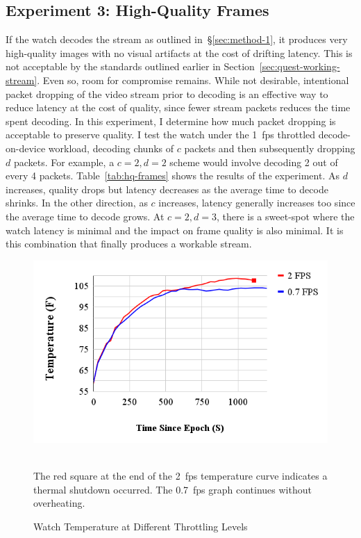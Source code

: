 \subsection{Experiment 3: High-Quality Frames}
If the watch decodes the stream as outlined in~\S\ref{sec:method-1}, it produces very high-quality images with no visual artifacts at the cost of drifting latency. This is not acceptable by the standards outlined earlier in Section~\ref{sec:quest-working-stream}. Even so, room for compromise remains. While not desirable, intentional packet dropping of the video stream prior to decoding is an effective way to reduce latency at the cost of quality, since fewer stream packets reduces the time spent decoding. In this experiment, I determine how much packet dropping is acceptable to preserve quality. I test the watch under the 1~fps throttled decode-on-device workload, decoding chunks of $c$ packets and then subsequently dropping $d$ packets. For example, a $c=2, d=2$ scheme would involve decoding 2 out of every 4 packets. Table~\ref{tab:hq-frames} shows the results of the experiment. As $d$ increases, quality drops but latency decreases as the average time to decode shrinks. In the other direction, as $c$ increases, latency generally increases too since the average time to decode grows. At $c=2, d=3$, there is a sweet-spot where the watch latency is minimal and the impact on frame quality is also minimal. It is this combination that finally produces a workable stream.

\begin{figure}
    \centering
    \includegraphics[width=0.8\linewidth]{chapter3/FIGS/temperature.png}
    \begin{captext}
    \\[0.1cm]
    \small The red square at the end of the 2~fps temperature curve indicates a thermal shutdown occurred. The 0.7~fps graph continues without overheating.
    \end{captext}
    \caption{Watch Temperature at Different Throttling Levels}
    \label{fig:temperature}
\end{figure}

